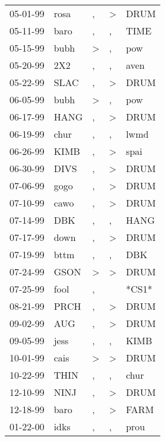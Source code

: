 \begin{supertabular}{lllll}
 05-01-99 &   rosa &                , &  \textgreater &   DRUM \\
 05-11-99 &   baro &                , &             , &   TIME \\
 05-15-99 &   bubh &     \textgreater &             , &    pow \\
 05-20-99 &    2X2 &                , &             , &   aven \\
 05-22-99 &   SLAC &                , &  \textgreater &   DRUM \\
 06-05-99 &   bubh &     \textgreater &             , &    pow \\
 06-17-99 &   HANG &                , &  \textgreater &   DRUM \\
 06-19-99 &   chur &                , &             , &   lwmd \\
 06-26-99 &   KIMB &                , &  \textgreater &   spai \\
 06-30-99 &   DIVS &                , &  \textgreater &   DRUM \\
 07-06-99 &   gogo &                , &  \textgreater &   DRUM \\
 07-10-99 &   cawo &                , &  \textgreater &   DRUM \\
 07-14-99 &    DBK &                , &             , &   HANG \\
 07-17-99 &   down &                , &  \textgreater &   DRUM \\
 07-19-99 &   bttm &                , &             , &    DBK \\
 07-24-99 &   GSON &     \textgreater &  \textgreater &   DRUM \\
 07-25-99 &   fool &                , &               &  *CS1* \\
 08-21-99 &   PRCH &                , &  \textgreater &   DRUM \\
 09-02-99 &    AUG &                , &  \textgreater &   DRUM \\
 09-05-99 &   jess &                , &             , &   KIMB \\
 10-01-99 &   cais &     \textgreater &  \textgreater &   DRUM \\
 10-22-99 &   THIN &                , &             , &   chur \\
 12-10-99 &   NINJ &                , &  \textgreater &   DRUM \\
 12-18-99 &   baro &                , &  \textgreater &   FARM \\
 01-22-00 &   idks &                , &             , &   prou \\

\end{supertabular}
